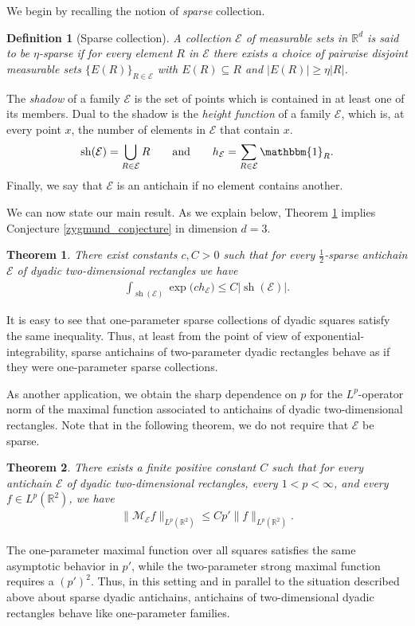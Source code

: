 \documentclass[oneside]{amsart}
\newtheorem{TheoremLetter}{Theorem}
\newtheorem*{definition*}{Definition}
\theoremstyle{definition}
\theoremstyle{plain}
\numberwithin{equation}{section}
\numberwithin{theorem}{section}
\newcommand{\sh}{\operatorname{sh}}
\newcommand{\ind}{\mathbbm{1}}
\begin{document}
We begin by recalling the notion of \emph{sparse} collection.
\begin{definition*}[Sparse collection]
  A collection $\mathcal{E}$ of measurable sets in $\mathbb{R}^d$ is said to be
  $\eta$-sparse if for every element $R$ in $\mathcal{E}$ there
  exists a choice of pairwise disjoint measurable sets $\{E(R)\}_{R \in
  \mathcal{E}}$ with $E(R) \subseteq R$ and $|E(R)| \geq \eta|R|$.
\end{definition*}
The \emph{shadow} of a family $\mathcal{E}$ is the set of points which
is contained in at least one of its members.
Dual to the shadow is the \emph{height function} of a family $\mathcal{E}$,
which is, at every point $x$, the number of elements in $\mathcal{E}$ that
contain $x$.
\begin{align*}
  \sh(\mathcal{E}) = \bigcup_{R \in \mathcal{E}} R
  \qquad\text{and}\qquad
  h_{\mathcal{E}} = \sum_{R \in \mathcal{E}} \ind_R.
\end{align*}
Finally, we say that $\mathcal{E}$ is an antichain if no element contains another.

We can now state our main result.
As we explain below, Theorem \ref{MT:ExpInt}
implies Conjecture \ref{zygmund_conjecture} in dimension $d=3$.
\begin{TheoremLetter} \label{MT:ExpInt}
  There exist constants $c,C > 0$ such that
  for every $\frac{1}{2}$-sparse antichain $\mathcal{E}$ of dyadic two-dimensional
  rectangles we have
  \begin{align*}
    \int_{\sh(\mathcal{E})} \exp\big(
      c h_{\mathcal{E}}
    \big) \leq C |\sh(\mathcal{E})|.
  \end{align*}
\end{TheoremLetter}
It is easy to see that one-parameter sparse collections of dyadic squares
satisfy the same inequality.
Thus, at least from the point of view of exponential-integrability,
sparse antichains of two-parameter dyadic rectangles behave as if they were
one-parameter sparse collections.


As another application, we obtain the sharp dependence on $p$ for the
$L^{p}$-operator norm of the maximal function associated to antichains of
dyadic two-dimensional rectangles.
Note that in the following theorem, we do not require that $\mathcal{E}$ be
sparse.
\begin{TheoremLetter} \label{MT:SharpLpForAntichainM}
  There exists a finite positive constant $C$ such that for
  every antichain $\mathcal{E}$ of dyadic two-dimensional rectangles,
  every $1 < p < \infty$,
  and every $f \in L^p(\mathbb{R}^2)$,
  we have
  \begin{align*}
    \|\mathcal{M}_{\mathcal{E}} f\|_{L^{p}(\mathbb{R}^2)} \leq Cp'
    \|f\|_{L^p(\mathbb{R}^2)}.
  \end{align*}
\end{TheoremLetter}
The one-parameter maximal function over all squares satisfies the same
asymptotic behavior in $p'$,
while the two-parameter strong maximal function requires a $(p')^2$.
Thus, in this setting and in parallel to the situation described above about
sparse dyadic antichains, antichains of two-dimensional dyadic rectangles behave
like one-parameter families.
\end{document}

